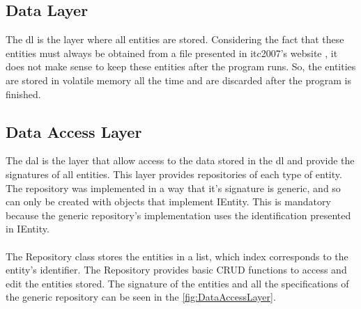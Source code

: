 \subsection{Data Layer}

The \gls{dl} is the layer where all entities are stored. Considering the fact that these entities must always be obtained from a file presented in \gls{itc2007}'s website \cite{McCollum2007a}, it does not make sense to keep these entities after the program runs. So, the entities are stored in volatile memory all the time and are discarded after the program is finished.

\subsection{Data Access Layer}

The \gls{dal} is the layer that allow access to the data stored in the \gls{dl} and provide the signatures of all entities. This layer provides repositories of each type of entity. The repository was implemented in a way that it's signature  is generic, and so can only be created with objects that implement IEntity. This is mandatory because the generic repository's implementation uses the identification presented in IEntity. \\
\\
The Repository class stores the entities in a list, which index corresponds to the entity's identifier. The Repository provides basic CRUD functions to access and edit the entities stored. The signature of the entities and all the specifications of the generic repository can be seen in the \ref{fig:DataAccessLayer}.\\

